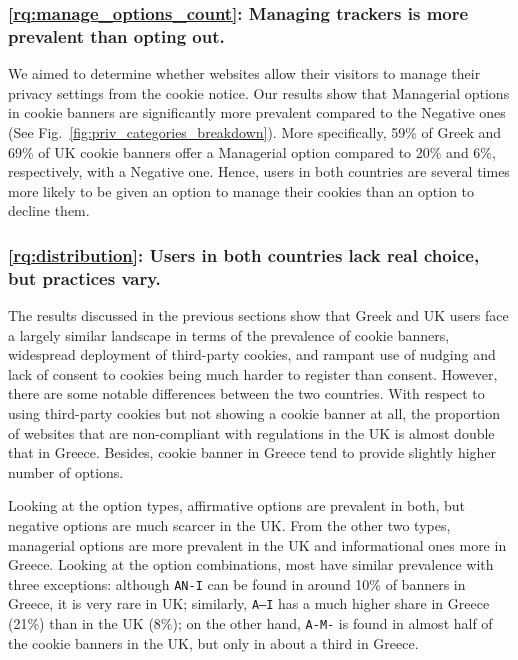 \subsubsection{\ref{rq:manage_options_count}: Managing trackers is more prevalent than opting out.}
We aimed to determine whether websites allow their visitors to manage their privacy settings from the cookie notice. Our results show that Managerial options in cookie banners are significantly more prevalent compared to the Negative ones (See Fig.~\ref{fig:priv_categories_breakdown}). More specifically, 59\% of Greek and 69\% of UK cookie banners offer a Managerial option compared to 20\% and 6\%, respectively, with a Negative one. Hence, users in both countries are several times more likely to be given an option to manage their cookies than an option to decline them. 

\subsubsection{\ref{rq:distribution}: Users in both countries lack real choice, but practices vary.}
The results discussed in the previous sections show that Greek and UK users face a largely similar landscape in terms of the prevalence of cookie banners, widespread deployment of third-party cookies, and rampant use of nudging and lack of consent to cookies being much harder to register than consent. 
However, there are some notable differences between the two countries. 
With respect to using third-party cookies but not showing a cookie banner at all, the proportion of websites that are non-compliant with regulations in the UK is almost double that in Greece. Besides, cookie banner in Greece tend to provide slightly higher number of options. 

Looking at the option types, affirmative options are prevalent in both, but negative options are much scarcer in the UK. From the other two types, managerial options are more prevalent in the UK and informational ones more in Greece. Looking at the option combinations, most have similar prevalence with three exceptions: although \texttt{AN-I} can be found in around 10\% of banners in Greece, it is very rare in UK; similarly, \texttt{A--I} has a much higher share in Greece (21\%) than in the UK (8\%); on the other hand, \texttt{A-M-} is found in almost half of the cookie banners in the UK, but only in about a third in Greece. 